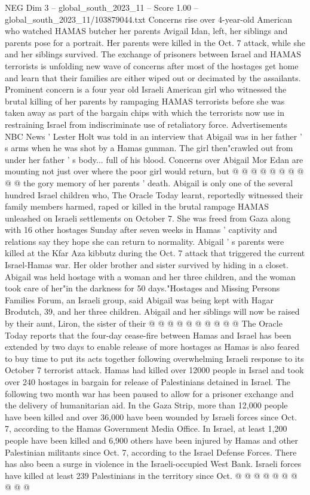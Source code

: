 \begin{textsample}{NEG Dim 3 – global\_south\_2023\_11 – Score 1.00 – global\_south\_2023\_11/103879044.txt}  \label{ex:f3_neg_087}
Concerns rise over 4-year-old American who watched HAMAS butcher her parents Avigail Idan, left, her siblings and parents pose for a portrait.
Her parents were killed in the Oct. 7 attack, while she and her siblings survived.
The exchange of prisoners between Israel and HAMAS terrorists is unfolding new wave of concerns after most of the hostages get home and learn that their families are either wiped out or decimated by the assailants.
Prominent concern is a four year old Israeli American girl who witnessed the brutal killing of her parents by rampaging HAMAS terrorists before she was taken away as part of the bargain chips with which the terrorists now use in restraining Israel from indiscriminate use of retaliatory force.
Advertisements NBC News ' Lester Holt was told in an interview that Abigail was in her father ' s arms when he was shot by a Hamas gunman.
The girl then"crawled out from under her father ' s body... full of his blood.
Concerns over Abigail Mor Edan are mounting not just over where the poor girl would return, but @ @ @ @ @ @ @ @ @ @ the gory memory of her parents ' death.
Abigail is only one of the several hundred Israel children who, The Oracle Today learnt, reportedly witnessed their family members harmed, raped or killed in the brutal rampage HAMAS unleashed on Israeli settlements on October 7.
She was freed from Gaza along with 16 other hostages Sunday after seven weeks in Hamas ' captivity and relations say they hope she can return to normality.
Abigail ' s parents were killed at the Kfar Aza kibbutz during the Oct. 7 attack that triggered the current Israel-Hamas war.
Her older brother and sister survived by hiding in a closet.
Abigail was held hostage with a woman and her three children, and the woman took care of her"in the darkness for 50 days."Hostages and Missing Persons Families Forum, an Israeli group, said Abigail was being kept with Hagar Brodutch, 39, and her three children.
Abigail and her siblings will now be raised by their aunt, Liron, the sister of their @ @ @ @ @ @ @ @ @ @ The Oracle Today reports that the four-day cease-fire between Hamas and Israel has been extended by two days to enable release of more hostages as Hamas is also feared to buy time to put its acts together following overwhelming Israeli response to its October 7 terrorist attack.
Hamas had killed over 12000 people in Israel and took over 240 hostages in bargain for release of Palestinians detained in Israel.
The following two month war has been paused to allow for a prisoner exchange and the delivery of humanitarian aid.
In the Gaza Strip, more than 12,000 people have been killed and over 36,000 have been wounded by Israeli forces since Oct. 7, according to the Hamas Government Media Office.
In Israel, at least 1,200 people have been killed and 6,900 others have been injured by Hamas and other Palestinian militants since Oct. 7, according to the Israel Defense Forces.
There has also been a surge in violence in the Israeli-occupied West Bank.
Israeli forces have killed at least 239 Palestinians in the territory since Oct. @ @ @ @ @ @ @ @ @ @

\end{textsample}
